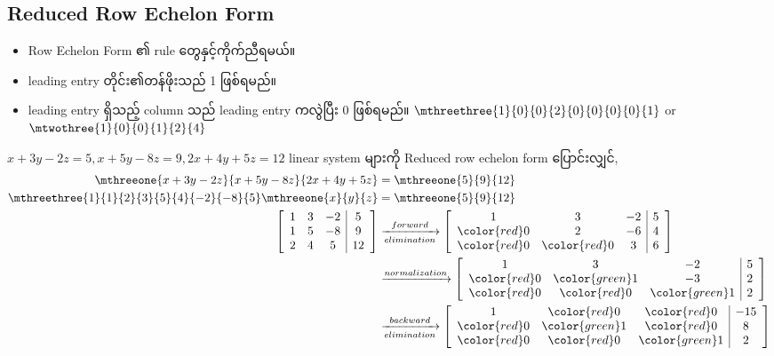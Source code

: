 \subsection{Reduced Row Echelon Form}
\begin{itemize}
    \item Row Echelon Form ၏ rule တွေနှင့်ကိုက်ညီရမယ်။
    \item leading entry တိုင်း၏တန်ဖိုးသည် 1 ဖြစ်ရမည်။
    \item leading entry ရှိသည့် column သည် leading entry ကလွဲပြီး 0 ဖြစ်ရမည်။ $\mthreethree{1}{0}{0}{2}{0}{0}{0}{0}{1}$ or $\mtwothree{1}{0}{0}{1}{2}{4}$
\end{itemize}
$x+3y-2z=5, x+5y-8z=9, 2x+4y+5z=12$ linear system များကို Reduced row echelon form ပြောင်းလျှင်,
\[
    \begin{split}
        \mthreeone{x+3y-2z}{x+5y-8z}{2x+4y+5z}&=\mthreeone{5}{9}{12} \\
        \mthreethree{1}{1}{2}{3}{5}{4}{-2}{-8}{5}\mthreeone{x}{y}{z}&=\mthreeone{5}{9}{12} \\
        \hspace{5mm}\left[\begin{array}{c c c | c}
            1 & 3 & -2 & 5 \\
            1 & 5 & -8 & 9 \\
            2 & 4 & 5 & 12
        \end{array}\right]&\xrightarrow[elimination]{forward}\left[\begin{array}{c c c | c}
            1 & 3 & -2 & 5 \\
            {\color{red}0} & 2 & -6 & 4 \\
            {\color{red}0} & {\color{red}0} & 3 & 6
        \end{array}\right] \\
        &\xrightarrow{normalization}\left[\begin{array}{c c c | c}
            1 & 3 & -2 & 5 \\
            {\color{red}0} & {\color{green} 1} & -3 & 2 \\
            {\color{red}0} & {\color{red}0} & {\color{green} 1} & 2
        \end{array}\right] \\
        &\xrightarrow[elimination]{backward}\left[\begin{array}{c c c | c}
            1 & {\color{red}0} & {\color{red}0} & -15 \\
            {\color{red}0} & {\color{green} 1} & {\color{red}0} & 8 \\
            {\color{red}0} & {\color{red}0} & {\color{green} 1} & 2
        \end{array}\right]
    \end{split}
\]